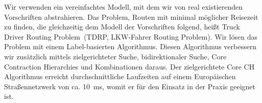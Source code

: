 \documentclass{thesisclass}
\begin{document}
\begin{addmargin}{0.5cm}
	Wir verwenden ein vereinfachtes Modell, mit dem wir von real existierenden Vorschriften abstrahieren. Das Problem, Routen mit minimal möglicher Reisezeit zu finden, die gleichzeitig dem Modell der Vorschriften folgend, heißt \glqq Truck Driver Routing Problem\grqq\ (TDRP, \glqq LKW-Fahrer Routing Problem\grqq).  Wir lösen das Problem mit einem Label-basierten Algorithmus. Diesen Algorithmus verbessern wir zusätzlich mittels zielgerichteter Suche, bidirektionaler Suche, Core Contraction Hierarchies und Kombinationen daraus. Der zielgerichtete Core CH Algorithmus erreicht durchschnittliche Laufzeiten auf einem Europäischen Straßennetzwerk von ca. \SI{10}{\milli\second}, womit er für den Einsatz in der Praxis geeignet ist.
\end{addmargin}

\blankpage


\tableofcontents
\blankpage



\mainmatter
{}










\cleardoublepage
{}
{}

{} %
{} %

% 





\cleardoublepage

\end{document}
